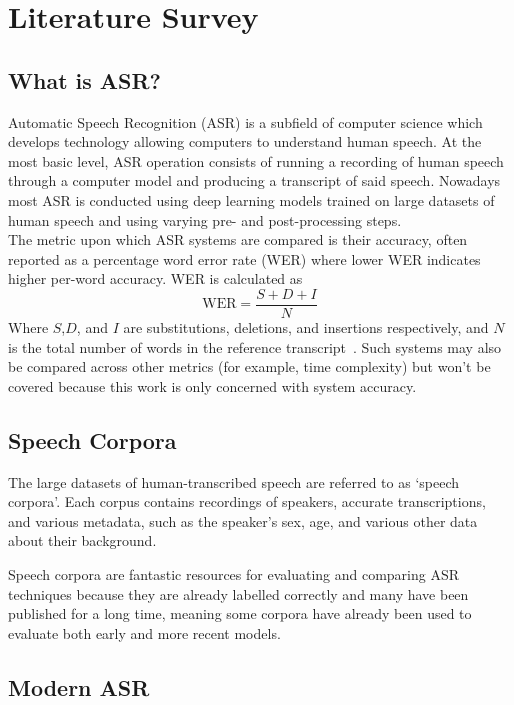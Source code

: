 \chapter{Literature Survey}\label{ch:literature-survey}

\section{What is ASR?}\label{sec:what-is-asr?}

Automatic Speech Recognition (ASR) is a subfield of computer science which develops technology
allowing computers to understand human speech.
At the most basic level, ASR operation consists of running a recording of human speech through a
computer model and producing a transcript of said speech.
Nowadays most ASR is conducted using deep learning models trained on large datasets of human
speech and using varying pre- and post-processing steps.\\

The metric upon which ASR systems are compared is their accuracy, often reported as a percentage
word error rate (WER) where lower WER indicates higher per-word accuracy.
WER is calculated as
\[
    \text{WER} = \frac{S + D + I}{N}
\]
Where $S$,$D$, and $I$ are substitutions, deletions, and insertions respectively, and $N$ is the
total number of words in the reference transcript~\cite{gaikwad2010review}.
Such systems may also be compared across other metrics (for example, time complexity) but won't
be covered because this work is only concerned with system accuracy.

\section{Speech Corpora}\label{sec:speech-corpora}

The large datasets of human-transcribed speech are referred to as `speech corpora'.
Each corpus contains recordings of speakers, accurate transcriptions, and various metadata, such as
the speaker's sex, age, and various other data about their background.

Speech corpora are fantastic resources for evaluating and comparing ASR techniques because they
are already labelled correctly and many have been published for a long time, meaning some corpora
have already been used to evaluate both early and more recent models.

\section{Modern ASR}\label{sec:modern-asr}

